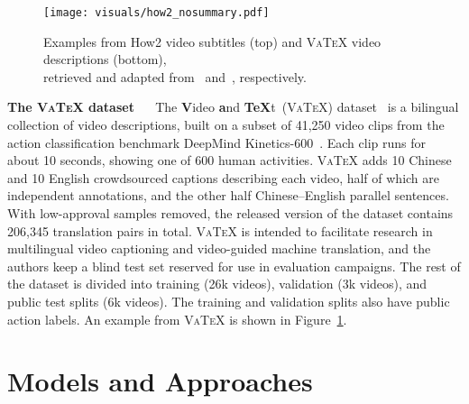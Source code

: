 \documentclass{svjour3}
\newcommand{\element}[1]{\noindent\textbf{#1} ~~}
\newcommand{\vatex}{\textsc{VaTeX}}
\begin{document}
      
\begin{figure}[t]
            \centering
            \texttt{[image: visuals/how2\_nosummary.pdf]}
            \caption{Examples from How2 video subtitles (top) and \vatex{} video descriptions (bottom),\\ retrieved and adapted from~\citet{sanabria-how2:-2018} and~\citet{wang-vatex-2019}, respectively.}
            \label{fig:datasets:vgt}
        \end{figure}


        \element{The \vatex{} dataset}
            The \textbf{V}ideo \textbf{a}nd \textbf{TeX}t~(\vatex{}) dataset~\citep{wang-vatex-2019} is a bilingual collection of video descriptions, built on a subset of 41,250 video clips from the action classification benchmark DeepMind Kinetics-600~\citep{kay-kinetics-2017,carreira-short-2018}. Each clip runs for about 10 seconds, showing one of 600 human activities. \vatex{} adds 10 Chinese and 10 English crowdsourced captions describing each video, half of which are independent annotations, and the other half Chinese--English parallel sentences. With low-approval samples removed, the released version of the dataset contains 206,345 translation pairs in total. \vatex{} is intended to facilitate research in multilingual video captioning and video-guided machine translation, and the authors keep a blind test set reserved for use in evaluation campaigns. The rest of the dataset is divided into training (26k videos), validation (3k videos), and public test splits (6k videos). The training and validation splits also have public action labels. An example from \vatex{} is shown in Figure~\ref{fig:datasets:vgt}.
 


\section{Models and Approaches}
\label{sec:models}
    
\end{document}
